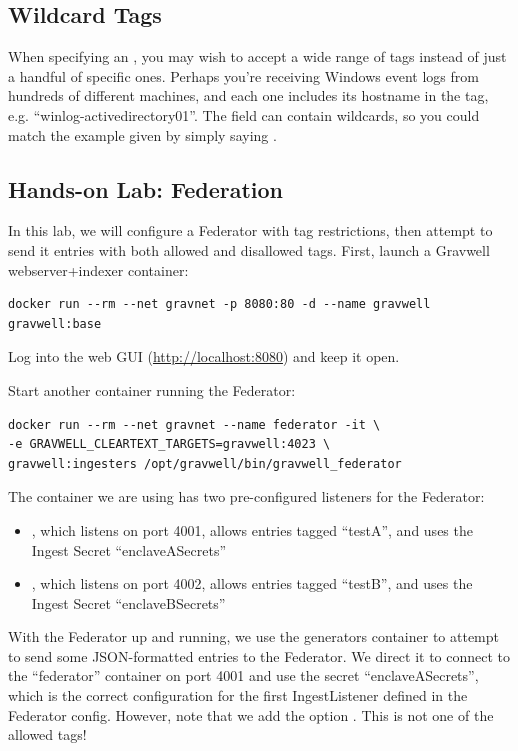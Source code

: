 \subsection{Wildcard Tags}

When specifying an , you may wish to accept a wide range of tags instead of just a handful of specific ones. Perhaps you're receiving Windows event logs from hundreds of different machines, and each one includes its hostname in the tag, e.g. ``winlog-activedirectory01''. The  field can contain wildcards, so you could match the example given by simply saying .

\subsection{Hands-on Lab: Federation}

In this lab, we will configure a Federator with tag restrictions, then
attempt to send it entries with both allowed and disallowed tags. First,
launch a Gravwell webserver+indexer container:

\begin{Verbatim}[breaklines=true]
docker run --rm --net gravnet -p 8080:80 -d --name gravwell gravwell:base
\end{Verbatim}

Log into the web GUI (\href{http://localhost:8080}{http://localhost:8080}) and keep it open.

Start another container running the Federator:

\begin{Verbatim}[breaklines=true]
docker run --rm --net gravnet --name federator -it \
-e GRAVWELL_CLEARTEXT_TARGETS=gravwell:4023 \
gravwell:ingesters /opt/gravwell/bin/gravwell_federator
\end{Verbatim}

The container we are using has two pre-configured listeners for the
Federator:

\begin{itemize}
\item
  , which listens on port 4001, allows entries tagged
  ``testA'', and uses the Ingest Secret ``enclaveASecrets''
\item
  \code{enclaveB}, which listens on port 4002, allows entries tagged
  ``testB'', and uses the Ingest Secret ``enclaveBSecrets''
\end{itemize}

With the Federator up and running, we use the generators container to attempt to send some JSON-formatted
entries to the Federator. We direct it to connect to the ``federator'' container on port 4001 and
use the secret ``enclaveASecrets'', which is the correct configuration
for the first IngestListener defined in the Federator config. However, note that we
add the option \code{-tag-name json}. This is not one of the allowed tags!

